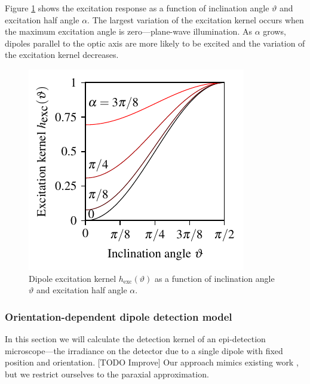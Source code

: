 \documentclass[]{osa-article}
\begin{document}
Figure \ref{fig:excitation} shows the excitation response as a function of
inclination angle $\vartheta$ and excitation half angle $\alpha$. The largest
variation of the excitation kernel occurs when the maximum excitation angle is
zero---plane-wave illumination. As $\alpha$ grows, dipoles parallel to the optic
axis are more likely to be excited and the variation of the excitation kernel
decreases.
\begin{figure}[h]
 \centering
   \centering
   \includegraphics[scale=0.95]{../figures/excitation/excitation.pdf}
   \caption{Dipole excitation kernel $h_{\text{exc}}(\vartheta)$ as a function of
     inclination angle $\vartheta$ and excitation half angle $\alpha$.}
   \label{fig:excitation}
 \end{figure}

 \subsubsection{Orientation-dependent dipole detection model}
 In this section we will calculate the detection kernel of an epi-detection
 microscope---the irradiance on the detector due to a single dipole with fixed
 position and orientation. [TODO Improve] Our approach mimics existing work
 \cite{backer2014, nov2006, agrawal2012}, but we restrict ourselves to the
 paraxial approximation.
\end{document}
